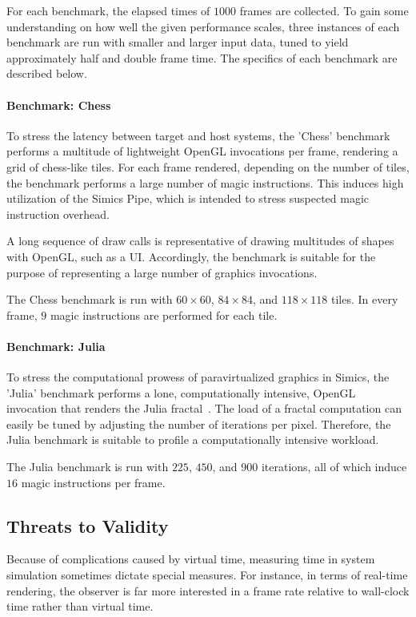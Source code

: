 For each benchmark, the elapsed times of $1000$ frames are collected.
To gain some understanding on how well the given performance scales, three instances of each benchmark are run with smaller and larger input data, tuned to yield approximately half and double frame time.
The specifics of each benchmark are described below.



\paragraph{Benchmark: Chess}
To stress the latency between target and host systems, the 'Chess' benchmark performs a multitude of lightweight OpenGL invocations per frame, rendering a grid of chess-like tiles.
For each frame rendered, depending on the number of tiles, the benchmark performs a large number of magic instructions.
This induces high utilization of the Simics Pipe, which is intended to stress suspected magic instruction overhead.

A long sequence of draw calls is representative of drawing multitudes of shapes with OpenGL, such as a UI.
Accordingly, the benchmark is suitable for the purpose of representing a large number of graphics invocations.

The Chess benchmark is run with $60\times60$, $84\times84$, and $118\times118$ tiles.
In every frame, $9$ magic instructions are performed for each tile.

\paragraph{Benchmark: Julia}
To stress the computational prowess of paravirtualized graphics in Simics, the 'Julia' benchmark performs a lone, computationally intensive, OpenGL invocation that renders the Julia fractal~.
The load of a fractal computation can easily be tuned by adjusting the number of iterations per pixel.
Therefore, the Julia benchmark is suitable to profile a computationally intensive workload. %

The Julia benchmark is run with $225$, $450$, and $900$ iterations, all of which induce $16$ magic instructions per frame.

\subsection{Threats to Validity}
\label{sec:threatstovalidity}
Because of complications caused by virtual time, measuring time in system simulation sometimes dictate special measures.
For instance, in terms of real-time rendering, the observer is far more interested in a frame rate relative to wall-clock time rather than virtual time.


